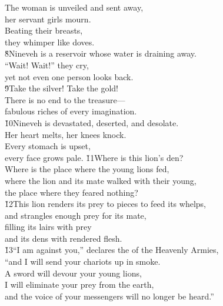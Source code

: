 \begin{poetry}
\poemll    The woman is unveiled and sent away, \\
\poemlll       her servant girls mourn. \\
\poeml Beating their breasts, \\
\poemll    they whimper like doves. \\
\poeml \v{8}Nineveh is a reservoir whose water is draining away. \\
\poemll    ``Wait! Wait!'' they cry, \\
\poemlll       yet not even one person looks back. \\
\poeml \v{9}Take the silver! Take the gold! \\
\poemll    There is no end to the treasure--- \\
\poemlll       fabulous riches of every imagination. \\
\poeml \v{10}Nineveh is devastated, deserted, and desolate. \\
\poemll    Her heart melts, her knees knock. \\
\poeml Every stomach is upset, \\
\poemll    every face grows pale.
\poeml \v{11}Where is this lion's den? \\
\poemll    Where is the place where the young lions fed, \\
\poeml where the lion and its mate walked with their young, \\
\poemll    the place where they feared nothing? \\
\poeml \v{12}This lion renders its prey to pieces to feed its whelps, \\
\poemll    and strangles enough prey for its mate, \\
\poeml filling its lairs with prey \\
\poemll    and its dens with rendered flesh. \\
\poeml \v{13}``I am against you,'' declares the  of the Heavenly Armies, \\
\poemll    ``and I will send your chariots up in smoke. \\
\poeml A sword will devour your young lions, \\
\poemll    I will eliminate your prey from the earth, \\
\poemlll       and the voice of your messengers will no longer be heard.''
\end{poetry}

